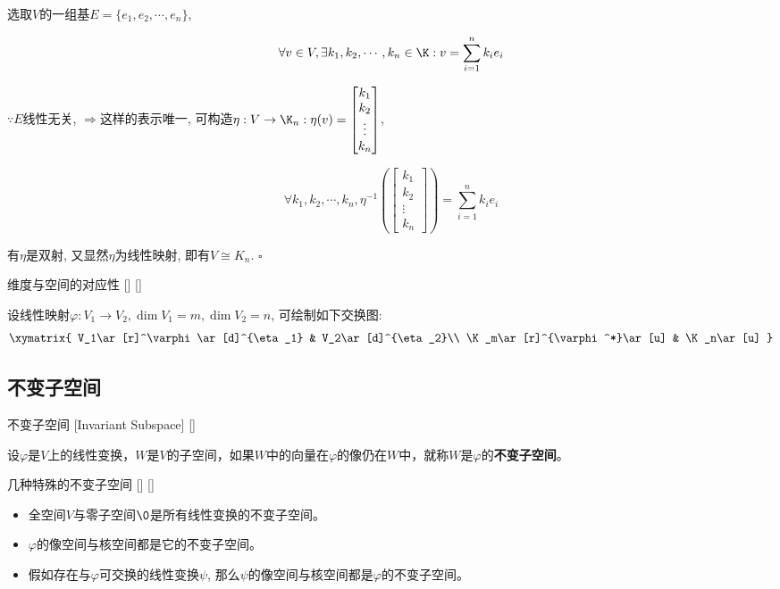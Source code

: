 \documentclass[UTF8]{ctexart}
\begin{document}
		\begin{prf}
			选取$V$的一组基$E=\{e_1,e_2,\cdots,e_n\}$, 
			
			$$\forall v\in V, \exists k_1,k_2,\cdots,k_n\in\K:v=\sum_{i=1}^nk_ie_i$$
			
			$\because E$线性无关, $\Longrightarrow$这样的表示唯一, 可构造$\eta:V\to\K_n: \eta(v)=\begin{bmatrix}k_1\\k_2\\\vdots\\k_n\end{bmatrix}$, 
			
			$$\forall k_1,k_2,\cdots,k_n, \eta^{-1}(\begin{bmatrix}k_1\\k_2\\\vdots\\k_n\end{bmatrix})=\sum_{i=1}^nk_ie_i$$
			
			有$\eta$是双射, 又显然$\eta$为线性映射, 即有$V\cong K_n$. $\square$
		\end{prf}
  
		\begin{thm}
			[]
			{维度与空间的对应性}
			[]
			[]

			设线性映射$\varphi:V_1\to V_2, \dim V_1=m, \dim V_2=n$, 可绘制如下交换图: 
			$$\begin{matrix}
			\xymatrix{
			V_1\ar[r]^\varphi\ar[d]^{\eta_1} & V_2\ar[d]^{\eta_2}\\
			\K_m\ar[r]^{\varphi^*}\ar[u] & \K_n\ar[u]
			}
			\end{matrix}$$
		\end{thm}

	\subsection{不变子空间}
		\begin{dfn}
			[]
			{不变子空间}
			[Invariant Subspace]
			[]

			设$\varphi$是$V$上的线性变换，$W$是$V$的子空间，如果$W$中的向量在$\varphi$的像仍在$W$中，就称$W$是$\varphi$的\textbf{不变子空间}。
		\end{dfn}

		\begin{ppt}
			[]
			{几种特殊的不变子空间}
			[]
			[]

			\begin{itemize}
				\item 全空间$V$与零子空间$\0$是所有线性变换的不变子空间。
				\item $\varphi$的像空间与核空间都是它的不变子空间。
				\item 假如存在与$\varphi$可交换的线性变换$\psi$, 那么$\psi$的像空间与核空间都是$\varphi$的不变子空间。
			\end{itemize}
		\end{ppt}
	
\end{document}
